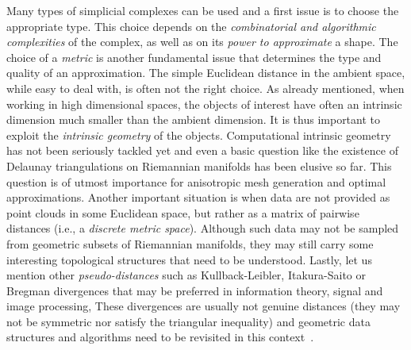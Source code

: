  Many types of simplicial complexes can be used and a first issue is to choose the appropriate type. This choice depends on the {\em combinatorial and algorithmic complexities} of the complex, as well as on its {\em power to approximate} a shape.
 The choice of a {\em metric} is another  fundamental issue 
that determines the type and quality of an approximation.
 The simple Euclidean distance in the ambient space, while easy to deal with, is often not the right choice.  As already mentioned, when working in high dimensional spaces, the objects of interest have often an intrinsic dimension much smaller than the ambient dimension. It is thus important to exploit the {\em intrinsic geometry} of the objects. Computational intrinsic geometry has not been seriously tackled yet and even a basic question like the existence of  Delaunay triangulations on Riemannian manifolds has been elusive so far.  This question is of utmost importance for anisotropic mesh generation and optimal approximations. Another important situation is when data are not provided as  point clouds in some Euclidean space, but rather as a matrix of pairwise distances (i.e., a {\em discrete metric space}). Although such data may not be sampled from geometric subsets of Riemannian manifolds, they may still carry some interesting topological structures that need to be understood. 
Lastly, let us mention other {\em pseudo-distances} such as Kullback-Leibler, Itakura-Saito or Bregman divergences that may be preferred in information theory, signal and image processing,
 These divergences are usually not genuine distances (they may not be symmetric nor satisfy the triangular inequality) and  geometric data structures and algorithms need to be revisited in this context~\cite{geometrica-6154a}.


\vspace{-1mm}

